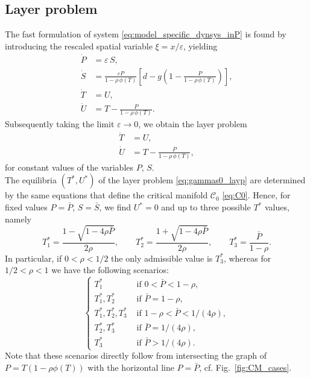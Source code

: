 \documentclass[a4paper,10pt,abstract=true,parskip=true]{scrartcl}
\theoremstyle{remark}
\numberwithin{equation}{section}
\numberwithin{thm}{section}
\newcommand{\eps}{\varepsilon}
\begin{document}
\subsection{Layer problem}
The fast formulation of system \eqref{eq:model_specific_dynsys_inP} is found by introducing the rescaled spatial variable $\xi = x/\eps$, yielding
\begin{subequations}\label{eq:gammas0_fast}
    \begin{align}
        \dot{P} &= \eps\,S,\\
        \dot{S} &= \frac{\eps P}{1 - \rho\,\phi(T)}\left[d- g\left(1-\frac{P}{1 - \rho\,\phi(T)}\right)\right],\\
        \dot{T} &= U,\\
        \dot{U} &= T - \frac{P}{1 - \rho\,\phi(T)}.
    \end{align}
\end{subequations}
Subsequently taking the limit $\eps \to 0$, we obtain the layer problem
\begin{subequations}\label{eq:gammas0_layp}
    \begin{align}
        \dot{T} &= U,\\
        \dot{U} &= T - \frac{P}{1 - \rho\,\phi(T)},
    \end{align}
\end{subequations}
for constant values of the variables $P$, $S$.~\\
The equilibria $(T^\ast,U^\ast)$ of the layer problem \eqref{eq:gammas0_layp} are determined by the same equations that define the critical manifold $\mathcal{C}_0$ \eqref{eq:C0}. Hence, for fixed values $P = \bar{P}$, $S = \bar{S}$, we find $U^\ast=0$
and up to three possible $T^\ast$ values, namely
\begin{equation} \label{eq:equilCM}
    T_1^\ast = \frac{1-\sqrt{1-4\rho \bar{P}}}{2 \rho}, \qquad T_2^\ast = \frac{1+\sqrt{1-4\rho \bar{P}}}{2 \rho}, \qquad T_3^\ast = \frac{\bar{P}}{1-\rho}.
\end{equation}
In particular, if $0 < \rho < 1/2$ the only admissible value is $T_3^\ast$, whereas for $1/2 < \rho < 1$ we have the following scenarios:
\begin{equation}
\begin{cases}
    T_1^\ast & \text{ if } 0 < \bar{P} < 1-\rho, \\
    T_1^\ast, T_2^\ast & \text{ if } \bar{P} = 1-\rho, \\
    T_1^\ast, T_2^\ast, T_3^\ast & \text{ if } 1-\rho < \bar{P} < 1/(4\rho), \\
    T_2^\ast, T_3^\ast & \text{ if } \bar{P} = 1/(4\rho), \\
    T_3^\ast & \text{ if } \bar{P} > 1/(4\rho).
\end{cases}
\end{equation}
Note that these scenarios directly follow from intersecting the graph of $P = T(1-\rho \phi(T))$ with the horizontal line $P = \bar{P}$, cf. Fig.~\ref{fig:CM_cases}.
\end{document}
